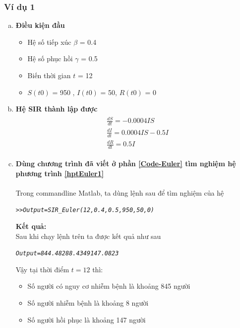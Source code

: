 \subsubsection{Ví dụ 1}\label{vd1-ppEuler}
\begin{enumerate}[a)]
\item \textbf{Điều kiện đầu}
	\begin{itemize}
		\item Hệ số tiếp xúc $ \beta $ = 0.4
		\item Hệ số phục hồi $ \gamma $ = 0.5
		\item Biến thời gian $ t $ = 12
		\item $ S(t0) $ = 950 , $ I(t0) $ = 50, $ R(t0) $ = 0
	\end{itemize}

\item \textbf {Hệ SIR thành lập được}
	\begin{align} \label{hptEuler1} \tag{I}
	    \begin{split} 
	        &\frac{dS}{dt} = -0.0004IS \\
	        &\frac{dI}{dt} = 0.0004IS - 0.5I \\
	        &\frac{dR}{dt} = 0.5I
	    \end{split}
	\end{align}
\item \textbf{Dùng chương trình đã viết ở  phần \ref{Code-Euler} tìm nghiệm hệ phương trình \eqref{hptEuler1} }\\
	\\Trong commandline Matlab, ta dùng lệnh sau để tìm nghiệm của hệ
	\begin{mdframed}[hidealllines=true,backgroundcolor=magenta!10]
	\begin{alltt}
	\textit{
	>> Output = SIR_Euler(12,0.4,0.5,950,50,0)
	}
	\end{alltt}
	\end{mdframed}
	
	\textbf{Kết quả:}\\
	Sau khi chạy lệnh trên ta được kết quả như sau
	\begin{mdframed}[hidealllines=true,backgroundcolor=blue!10]
	\begin{alltt}
	\textit{
	 Output = 844.4828    8.4349  147.0823
	}
	\end{alltt}
	\end{mdframed}
	Vậy tại thời điểm $ t = 12 $ thì:
	\begin{itemize}
		\item Số người có nguy cơ nhiễm bệnh là khoảng 845 người
		\item Số người nhiễm bệnh là khoảng 8 người
		\item Số người hồi phục là khoảng 147 người
	\end{itemize}


\end{enumerate}
